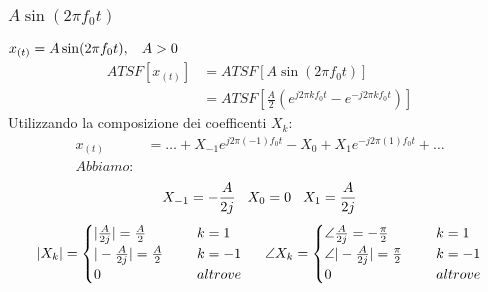             \subsubsection{$A\sin(2\pi f_0 t)$}
                $x_{(t)}=A\sin(2\pi f_0 t), \hspace{0.3cm} A>0$
                \begin{align}
                    ATSF[x_{(t)}] & = ATSF[A\sin(2\pi f_0 t)] \nonumber \\
                        & = ATSF[\frac{A}{2} (e^{j2\pi kf_0t} - e^{-j2\pi kf_0t})] \nonumber 
                \end{align}
                Utilizzando la composizione dei coefficenti $X_k$:
                \begin{align}
                    x_{(t)} & =\ldots  + X_{-1} e^{j2\pi (-1)f_0t} - X_{0} + X_{1} e^{-j2\pi (1) f_0t} + \ldots \nonumber\\
                    Abbiamo:& \nonumber 
                \end{align}
                        \[X_{-1} = -\frac{A}{2j}\hspace{.3cm} X_{0} = 0\hspace{.3cm} X_{1} = \frac{A}{2j}\] 
                \[
                    |X_k|= 
                    \begin{cases}
                            |\frac{A}{2j}| = \frac{A}{2} \hspace{0.5cm} & k= 1\\
                            |-\frac{A}{2j}| = \frac{A}{2} \hspace{0.5cm} & k= -1\\
                            0 \hspace{0.5cm} & altrove  \\
                    \end{cases}
                    \hspace{0.5cm}
                    \angle X_k= 
                    \begin{cases}
                        \angle \frac{A}{2j} = -\frac{\pi}{2} \hspace{0.5cm} & k= 1\\
                        \angle |-\frac{A}{2j}| = \frac{\pi}{2} \hspace{0.5cm} & k= -1\\
                        0 \hspace{0.5cm} & altrove  \\
                    \end{cases}
                    \]
